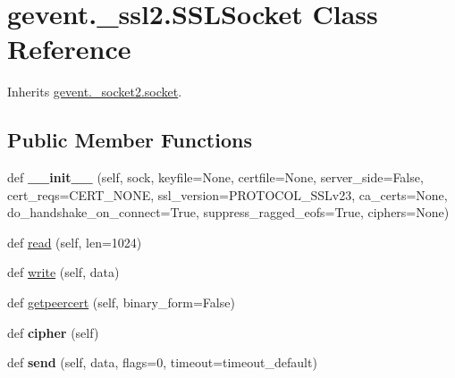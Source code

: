 \hypertarget{classgevent_1_1__ssl2_1_1_s_s_l_socket}{}\section{gevent.\+\_\+ssl2.\+S\+S\+L\+Socket Class Reference}
\label{classgevent_1_1__ssl2_1_1_s_s_l_socket}


Inherits \hyperlink{classgevent_1_1__socket2_1_1socket}{gevent.\+\_\+socket2.\+socket}.

\subsection*{Public Member Functions}
\begin{DoxyCompactItemize}
\item 
\mbox{\label{classgevent_1_1__ssl2_1_1_s_s_l_socket_a98e2a3327e925ba7f29d5cf4d689be46}} 
def {\bfseries \+\_\+\+\_\+init\+\_\+\+\_\+} (self, sock, keyfile=None, certfile=None, server\+\_\+side=False, cert\+\_\+reqs=C\+E\+R\+T\+\_\+\+N\+O\+NE, ssl\+\_\+version=P\+R\+O\+T\+O\+C\+O\+L\+\_\+\+S\+S\+Lv23, ca\+\_\+certs=None, do\+\_\+handshake\+\_\+on\+\_\+connect=True, suppress\+\_\+ragged\+\_\+eofs=True, ciphers=None)
\item 
def \hyperlink{classgevent_1_1__ssl2_1_1_s_s_l_socket_a462b66da5f2191f6ab8e43b204b46b27}{read} (self, len=1024)
\item 
def \hyperlink{classgevent_1_1__ssl2_1_1_s_s_l_socket_a06d8fc5ea8b75760fc6a972966d453e2}{write} (self, data)
\item 
def \hyperlink{classgevent_1_1__ssl2_1_1_s_s_l_socket_a0630f2d9816fffb0da4d8f1a4831127c}{getpeercert} (self, binary\+\_\+form=False)
\item 
\mbox{\label{classgevent_1_1__ssl2_1_1_s_s_l_socket_a4daf018ffce9b0e5f9709cc051caad20}} 
def {\bfseries cipher} (self)
\item 
\mbox{\label{classgevent_1_1__ssl2_1_1_s_s_l_socket_a199cd3d4d3a4db24c1c413f7daa8f560}} 
def {\bfseries send} (self, data, flags=0, timeout=timeout\+\_\+default)
\item 
\mbox{\label{classgevent_1_1__ssl2_1_1_s_s_l_socket_a2006948732025bff5d105cad976cb771}} 

\end{DoxyCompactItemize}
